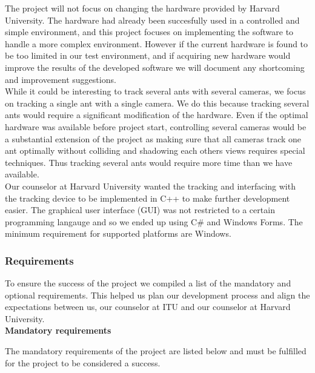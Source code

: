 The project will not focus on changing the hardware provided by Harvard University. The hardware had already been succesfully used in a controlled and simple environment, and this project focuses on implementing the software to handle a more complex environment. However if the current hardware is found to be too limited in our test environment, and if acquiring new hardware would improve the results of the developed software we will document any shortcoming and improvement suggestions.\\

While it could be interesting to track several ants with several cameras, we focus on tracking a single ant with a single camera. We do this because tracking several ants would require a significant modification of the hardware. Even if the optimal hardware was available before project start, controlling several cameras would be a substantial extension of the project as making sure that all cameras track one ant optimally without colliding and shadowing each others views requires special techniques. Thus tracking several ants would require more time than we have available. \\

Our counselor at Harvard University wanted the tracking and interfacing with the tracking device to be implemented in C++ to make further development easier. The graphical user interface (GUI) was not restricted to a certain programming langauge and so we ended up using C\# and Windows Forms. The minimum requirement for supported platforms are Windows.

\subsubsection{Requirements} \mbox{}\par
\label{requirements}

To ensure the success of the project we compiled a list of the mandatory and optional requirements. This helped us plan our development process and align the expectations between us, our counselor at ITU and our counselor at Harvard University. \\

\noindent \textbf{Mandatory requirements} \par
The mandatory requirements of the project are listed below and must be fulfilled for the project to be considered a success.

